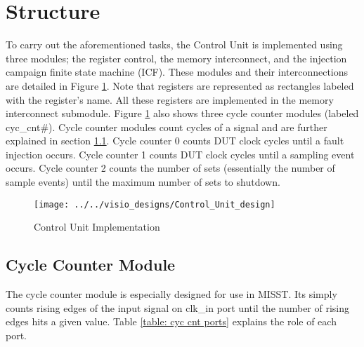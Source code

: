 \documentclass[]{report}
\begin{document}
\section{Structure}
\label{s cu structure}
To carry out the aforementioned tasks, the Control Unit is implemented using three modules; the register control, the memory interconnect, and the injection campaign finite state machine (ICF). These modules and their interconnections are detailed in Figure \ref{fig:control unit design}. Note that registers are represented as rectangles labeled with the register's name. All these registers are implemented in the memory interconnect submodule. Figure \ref{fig:control unit design} also shows three cycle counter modules (labeled cyc\_cnt\#). Cycle counter modules count cycles of a signal and are further explained in section \ref{ss cyc cnt}. Cycle counter 0 counts DUT clock cycles until a fault injection occurs. Cycle counter 1 counts DUT clock cycles until a sampling event occurs. Cycle counter 2 counts the number of sets (essentially the number of sample events) until the maximum number of sets to shutdown. 

\clearpage
\begin{figure}[h]
	\centering
	\texttt{[image: ../../visio\_designs/Control\_Unit\_design]}
	\caption{Control Unit Implementation}
	\label{fig:control unit design}
\end{figure}

\clearpage
\subsection{Cycle Counter Module}
\label{ss cyc cnt}

The cycle counter module is especially designed for use in MISST. Its simply counts rising edges of the input signal on clk\_in port until the number of rising edges hits a given value. Table \ref{table: cyc cnt ports} explains the role of each port.
\end{document}
